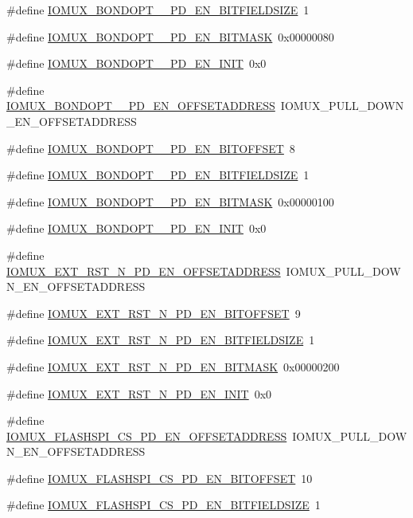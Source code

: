 \begin{DoxyCompactItemize}
\#define \hyperlink{a00560_af728b1fb09f5451666d64b8aff01e514}{IOMUX\_\-BONDOPT\_\_\-PD\_\-EN\_\-BITFIELDSIZE}~1
\item 
\#define \hyperlink{a00560_a14af1361b5d2cc73924d7b1973f641c2}{IOMUX\_\-BONDOPT\_\_\-PD\_\-EN\_\-BITMASK}~0x00000080
\item 
\#define \hyperlink{a00560_af8b2d17dc8a1b047dd6958b7c29e28f8}{IOMUX\_\-BONDOPT\_\_\-PD\_\-EN\_\-INIT}~0x0
\item 
\#define \hyperlink{a00560_a2193b82d42cbf2edcdcbf1cfe374033f}{IOMUX\_\-BONDOPT\_\_\-PD\_\-EN\_\-OFFSETADDRESS}~IOMUX\_\-PULL\_\-DOWN\_\-EN\_\-OFFSETADDRESS
\item 
\#define \hyperlink{a00560_ad6d334cb26894336c92b0274abe5cfe0}{IOMUX\_\-BONDOPT\_\_\-PD\_\-EN\_\-BITOFFSET}~8
\item 
\#define \hyperlink{a00560_a4fb4d20efd5f130947e49e0edcea8aea}{IOMUX\_\-BONDOPT\_\_\-PD\_\-EN\_\-BITFIELDSIZE}~1
\item 
\#define \hyperlink{a00560_a7d820432965e9028a831918a833b1ce8}{IOMUX\_\-BONDOPT\_\_\-PD\_\-EN\_\-BITMASK}~0x00000100
\item 
\#define \hyperlink{a00560_a0aa64f237ee8a3201f60e6f3bfb688ed}{IOMUX\_\-BONDOPT\_\_\-PD\_\-EN\_\-INIT}~0x0
\item 
\#define \hyperlink{a00560_afe3f1be2b12247f28a7c411338f446e3}{IOMUX\_\-EXT\_\-RST\_\-N\_\-PD\_\-EN\_\-OFFSETADDRESS}~IOMUX\_\-PULL\_\-DOWN\_\-EN\_\-OFFSETADDRESS
\item 
\#define \hyperlink{a00560_aad0b5cebf440af287a80f999f13b01c4}{IOMUX\_\-EXT\_\-RST\_\-N\_\-PD\_\-EN\_\-BITOFFSET}~9
\item 
\#define \hyperlink{a00560_a9d4ddf0f62556bb76ea07557528ce99e}{IOMUX\_\-EXT\_\-RST\_\-N\_\-PD\_\-EN\_\-BITFIELDSIZE}~1
\item 
\#define \hyperlink{a00560_af27d8826582cb366ce3b168cc23b59d5}{IOMUX\_\-EXT\_\-RST\_\-N\_\-PD\_\-EN\_\-BITMASK}~0x00000200
\item 
\#define \hyperlink{a00560_afc01c5e14d6db5a9769c6e08fc58c47b}{IOMUX\_\-EXT\_\-RST\_\-N\_\-PD\_\-EN\_\-INIT}~0x0
\item 
\#define \hyperlink{a00560_aa739d4f2edc87cb9ef41f6967aa97b5f}{IOMUX\_\-FLASHSPI\_\-CS\_\-PD\_\-EN\_\-OFFSETADDRESS}~IOMUX\_\-PULL\_\-DOWN\_\-EN\_\-OFFSETADDRESS
\item 
\#define \hyperlink{a00560_a681e48c771874d437b8ba1a78b9f6df5}{IOMUX\_\-FLASHSPI\_\-CS\_\-PD\_\-EN\_\-BITOFFSET}~10
\item 
\#define \hyperlink{a00560_a31bfab2aaf2e46683ba41e01700cca5c}{IOMUX\_\-FLASHSPI\_\-CS\_\-PD\_\-EN\_\-BITFIELDSIZE}~1

\end{DoxyCompactItemize}

